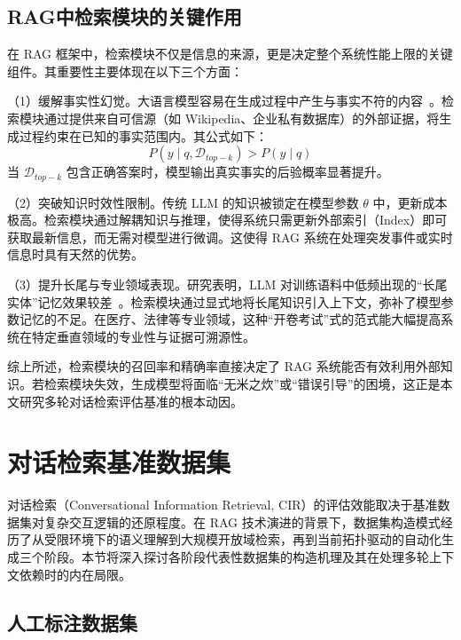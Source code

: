 \subsection{RAG中检索模块的关键作用}

在 RAG 框架中，检索模块不仅是信息的来源，更是决定整个系统性能上限的关键组件。其重要性主要体现在以下三个方面：

（1）缓解事实性幻觉。大语言模型容易在生成过程中产生与事实不符的内容~\citep{xu2025hallucination,shuster2021retrieval}。检索模块通过提供来自可信源（如 Wikipedia、企业私有数据库）的外部证据，将生成过程约束在已知的事实范围内。其公式如下：
\begin{equation}
    P(y \mid q, \mathcal{D}_{top-k}) > P(y \mid q)
\end{equation}
当 $\mathcal{D}_{top-k}$ 包含正确答案时，模型输出真实事实的后验概率显著提升。

（2）突破知识时效性限制。传统 LLM 的知识被锁定在模型参数 $\theta$ 中，更新成本极高。检索模块通过解耦知识与推理，使得系统只需更新外部索引（Index）即可获取最新信息，而无需对模型进行微调。这使得 RAG 系统在处理突发事件或实时信息时具有天然的优势。

（3）提升长尾与专业领域表现。研究表明，LLM 对训练语料中低频出现的“长尾实体”记忆效果较差~\citep{kandpal2023largelanguagemodelsstruggle}。检索模块通过显式地将长尾知识引入上下文，弥补了模型参数记忆的不足。在医疗、法律等专业领域，这种“开卷考试”式的范式能大幅提高系统在特定垂直领域的专业性与证据可溯源性。

综上所述，检索模块的召回率和精确率直接决定了 RAG 系统能否有效利用外部知识。若检索模块失效，生成模型将面临“无米之炊”或“错误引导”的困境，这正是本文研究多轮对话检索评估基准的根本动因。



\section{对话检索基准数据集}

对话检索（Conversational Information Retrieval, CIR）的评估效能取决于基准数据集对复杂交互逻辑的还原程度。在 RAG 技术演进的背景下，数据集构造模式经历了从受限环境下的语义理解到大规模开放域检索，再到当前拓扑驱动的自动化生成三个阶段。本节将深入探讨各阶段代表性数据集的构造机理及其在处理多轮上下文依赖时的内在局限。

\subsection{人工标注数据集}


